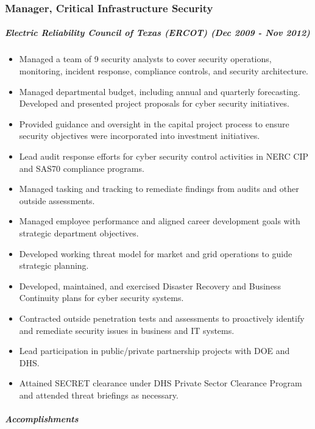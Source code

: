\documentclass[10pt,]{article}
\providecommand{\tightlist}{%
  \setlength{\itemsep}{0pt}\setlength{\parskip}{0pt}}
\let\oldsubparagraph\subparagraph
\renewcommand{\subparagraph}[1]{\oldsubparagraph{#1}\mbox{}}
\begin{document}
\subsubsection{Manager, Critical Infrastructure
Security}\label{manager-critical-infrastructure-security}

\subparagraph{\texorpdfstring{\emph{Electric Reliability Council of
Texas (ERCOT)} (Dec 2009 - Nov
2012)}{Electric Reliability Council of Texas (ERCOT) (Dec 2009 - Nov 2012)}}\label{electric-reliability-council-of-texas-ercot-dec-2009---nov-2012}

\begin{itemize}
\tightlist
\item
  Managed a team of 9 security analysts to cover security operations,
  monitoring, incident response, compliance controls, and security
  architecture.
\item
  Managed departmental budget, including annual and quarterly
  forecasting. Developed and presented project proposals for cyber
  security initiatives.
\item
  Provided guidance and oversight in the capital project process to
  ensure security objectives were incorporated into investment
  initiatives.
\item
  Lead audit response efforts for cyber security control activities in
  NERC CIP and SAS70 compliance programs.
\item
  Managed tasking and tracking to remediate findings from audits and
  other outside assessments.
\item
  Managed employee performance and aligned career development goals with
  strategic department objectives.
\item
  Developed working threat model for market and grid operations to guide
  strategic planning.
\item
  Developed, maintained, and exercised Disaster Recovery and Business
  Continuity plans for cyber security systems.
\item
  Contracted outside penetration tests and assessments to proactively
  identify and remediate security issues in business and IT systems.
\item
  Lead participation in public/private partnership projects with DOE and
  DHS.
\item
  Attained SECRET clearance under DHS Private Sector Clearance Program
  and attended threat briefings as necessary.
\end{itemize}

\subparagraph{Accomplishments}\label{accomplishments-1}
\end{document}
